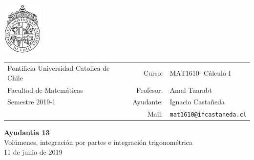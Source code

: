 \documentclass[12pt]{article}
\makeatletter
\newcommand{\ayudantia}{{\sc Ayudantía 13}}
\newcommand{\tituloayu}{Volúmenes, integración por partes e integración trigonométrica}
\newcommand{\fecha}{11 de junio de 2019}
\newcommand{\sigla}{MAT1610}
\newcommand{\nombre}{Cálculo I}
\newcommand{\profesor}{Amal Taarabt}
\newcommand{\ano}{2019}
\newcommand{\semestre}{1}
\newcommand{\mail}{mat1610@ifcastaneda.cl}
\makeatother
\begin{document}
\thispagestyle{empty}

\begin{minipage}{2cm}
	\includegraphics[width=2cm]{../../../../img/logo.pdf}
	\vspace{0.5cm}
\end{minipage}
\begin{minipage}{\linewidth}
	\begin{tabular}{lrl}
		{\scriptsize\sc Pontificia Universidad Catolica de Chile} & \hspace*{0.7in}Curso: &
		\sigla  - \nombre\\
		{\sc Facultad de Matemáticas}&
		Profesor: & \profesor \\
		{\sc Semestre \ano-\semestre} & Ayudante: & {Ignacio Castañeda}\\
		& {Mail:} & \texttt{\mail}
	\end{tabular}
\end{minipage}

\vspace{-10mm}
\begin{center}
	{\LARGE\bf \ayudantia}\\
	\vspace{0.1cm}
	{\tituloayu}\\
	\vspace{0.1cm}
	\fecha\\
	\vspace{0.4cm}
\end{center}
\end{document}
